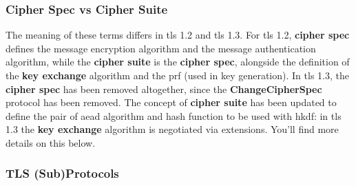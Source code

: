 \documentclass{llncs}
\begin{document}
\subsubsection{Cipher Spec vs Cipher Suite}

The meaning of these terms differs in \gls{tls} 1.2 and \gls{tls} 1.3. For \gls{tls} 1.2,
\textbf{cipher spec} defines the message encryption algorithm and the message
authentication algorithm, while the \textbf{cipher suite} is the \textbf{cipher spec},
alongside the definition of the \textbf{key exchange} algorithm and the \gls{prf} (used in key generation). In \gls{tls} 1.3, the
 \textbf{cipher spec} has been removed altogether, since the  \textbf{ChangeCipherSpec}
 protocol has been removed. The concept of \textbf{cipher suite} has been updated
 to define the pair of \gls{aead} algorithm and hash function to be used with
 \gls{hkdf}: in \gls{tls} 1.3 the  \textbf{key exchange} algorithm is negotiated via
 extensions. You'll find more details on this below.

\subsubsection{TLS (Sub)Protocols}
\end{document}
